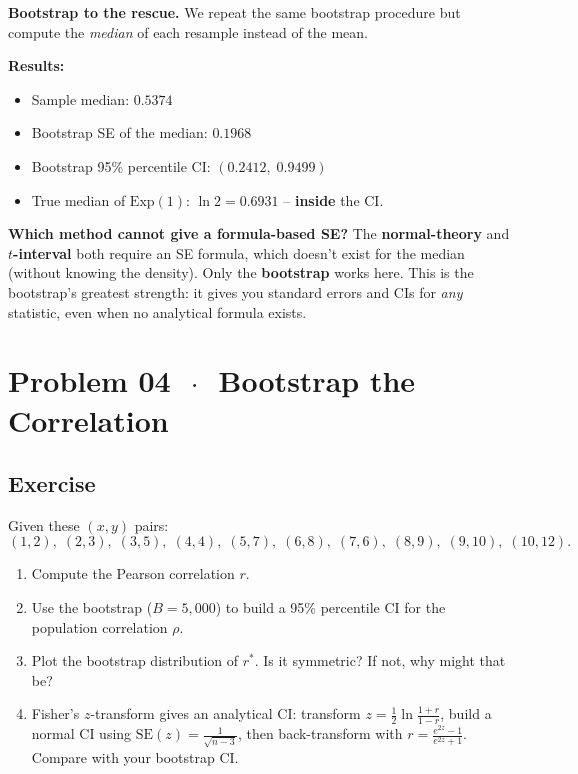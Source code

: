 \documentclass[11pt]{article}
\begin{document}
\textbf{Bootstrap to the rescue.} We repeat the same bootstrap procedure but compute the \textit{median} of each resample instead of the mean.

\textbf{Results:}
\begin{itemize}
  \item Sample median: $0.5374$
  \item Bootstrap SE of the median: $0.1968$
  \item Bootstrap 95\% percentile CI: $(0.2412,\; 0.9499)$
  \item True median of $\text{Exp}(1)$: $\ln 2 = 0.6931$ -- \textbf{inside} the CI.
\end{itemize}

\textbf{Which method cannot give a formula-based SE?} The \textbf{normal-theory} and \textbf{$t$-interval} both require an SE formula, which doesn't exist for the median (without knowing the density). Only the \textbf{bootstrap} works here. This is the bootstrap's greatest strength: it gives you standard errors and CIs for \textit{any} statistic, even when no analytical formula exists.

\section*{Problem 04 \texorpdfstring{$\,\cdot\,$}{-} Bootstrap the Correlation}

\subsection*{Exercise}

Given these $(x, y)$ pairs:
\[
  (1,2),\; (2,3),\; (3,5),\; (4,4),\; (5,7),\; (6,8),\; (7,6),\; (8,9),\; (9,10),\; (10,12).
\]

\begin{enumerate}[label=\alph*)]
  \item Compute the Pearson correlation $r$.
  \item Use the bootstrap ($B = 5{,}000$) to build a 95\% percentile CI for the population correlation $\rho$.
  \item Plot the bootstrap distribution of $r^*$. Is it symmetric? If not, why might that be?
  \item Fisher's $z$-transform gives an analytical CI: transform $z = \tfrac{1}{2}\ln\tfrac{1+r}{1-r}$, build a normal CI using $\text{SE}(z) = \tfrac{1}{\sqrt{n-3}}$, then back-transform with $r = \tfrac{e^{2z}-1}{e^{2z}+1}$. Compare with your bootstrap CI.
\end{enumerate}
\end{document}

